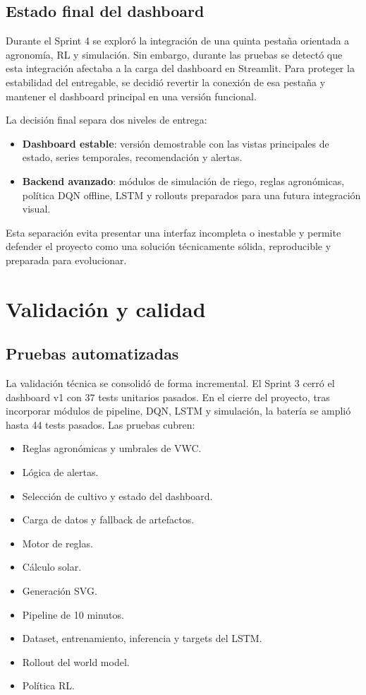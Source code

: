 ﻿\documentclass[11pt,a4paper]{article}
\begin{document}
\subsection{Estado final del dashboard}

Durante el Sprint 4 se exploró la integración de una quinta pestaña orientada a agronomía, RL y simulación. Sin embargo, durante las pruebas se detectó que esta integración afectaba a la carga del dashboard en Streamlit. Para proteger la estabilidad del entregable, se decidió revertir la conexión de esa pestaña y mantener el dashboard principal en una versión funcional.

La decisión final separa dos niveles de entrega:

\begin{itemize}
    \item \textbf{Dashboard estable}: versión demostrable con las vistas principales de estado, series temporales, recomendación y alertas.
    \item \textbf{Backend avanzado}: módulos de simulación de riego, reglas agronómicas, política DQN offline, LSTM y rollouts preparados para una futura integración visual.
\end{itemize}

Esta separación evita presentar una interfaz incompleta o inestable y permite defender el proyecto como una solución técnicamente sólida, reproducible y preparada para evolucionar.
\newpage


\section{Validación y calidad}

\subsection{Pruebas automatizadas}

La validación técnica se consolidó de forma incremental. El Sprint 3 cerró el dashboard v1 con 37 tests unitarios pasados. En el cierre del proyecto, tras incorporar módulos de pipeline, DQN, LSTM y simulación, la batería se amplió hasta 44 tests pasados. Las pruebas cubren:

\begin{itemize}
    \item Reglas agronómicas y umbrales de VWC.
    \item Lógica de alertas.
    \item Selección de cultivo y estado del dashboard.
    \item Carga de datos y fallback de artefactos.
    \item Motor de reglas.
    \item Cálculo solar.
    \item Generación SVG.
    \item Pipeline de 10 minutos.
    \item Dataset, entrenamiento, inferencia y targets del LSTM.
    \item Rollout del world model.
    \item Política RL.
\end{itemize}
\end{document}
